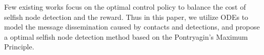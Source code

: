 %

Few existing works focus on
the optimal control policy to balance
the cost of selfish node detection
and the reward.
Thus in this paper,
we utilize ODEs to model the message dissemination
caused by contacts and detections,
and propose a optimal selfish node detection method
based on the Pontryagin's Maximum Principle.
